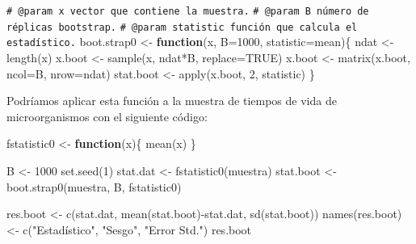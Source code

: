 \documentclass[
  10pt,
]{book}
\newenvironment{Shaded}{\begin{snugshade}}{\end{snugshade}}
\newcommand{\AttributeTok}[1]{\textcolor[rgb]{0.77,0.63,0.00}{#1}}
\newcommand{\CommentTok}[1]{\textcolor[rgb]{0.56,0.35,0.01}{\textit{#1}}}
\newcommand{\ConstantTok}[1]{\textcolor[rgb]{0.00,0.00,0.00}{#1}}
\newcommand{\ControlFlowTok}[1]{\textcolor[rgb]{0.13,0.29,0.53}{\textbf{#1}}}
\newcommand{\DecValTok}[1]{\textcolor[rgb]{0.00,0.00,0.81}{#1}}
\newcommand{\FunctionTok}[1]{\textcolor[rgb]{0.00,0.00,0.00}{#1}}
\newcommand{\NormalTok}[1]{#1}
\newcommand{\OtherTok}[1]{\textcolor[rgb]{0.56,0.35,0.01}{#1}}
\newcommand{\SpecialCharTok}[1]{\textcolor[rgb]{0.00,0.00,0.00}{#1}}
\newcommand{\StringTok}[1]{\textcolor[rgb]{0.31,0.60,0.02}{#1}}
\theoremstyle{break}
\theoremstyle{nonumberplain}
\renewcommand{\CommentTok}[1]{\textcolor[rgb]{0.41,0.41,0.41}{\texttt{#1}}}
\begin{document}
\begin{Shaded}
\begin{Highlighting}[]
\CommentTok{\#\textquotesingle{} @param x vector que contiene la muestra.}
\CommentTok{\#\textquotesingle{} @param B número de réplicas bootstrap.}
\CommentTok{\#\textquotesingle{} @param statistic función que calcula el estadístico.}
\NormalTok{boot.strap0 }\OtherTok{\textless{}{-}} \ControlFlowTok{function}\NormalTok{(x, }\AttributeTok{B=}\DecValTok{1000}\NormalTok{, }\AttributeTok{statistic=}\NormalTok{mean)\{}
\NormalTok{  ndat }\OtherTok{\textless{}{-}} \FunctionTok{length}\NormalTok{(x)}
\NormalTok{  x.boot }\OtherTok{\textless{}{-}} \FunctionTok{sample}\NormalTok{(x, ndat}\SpecialCharTok{*}\NormalTok{B, }\AttributeTok{replace=}\ConstantTok{TRUE}\NormalTok{)}
\NormalTok{  x.boot }\OtherTok{\textless{}{-}} \FunctionTok{matrix}\NormalTok{(x.boot, }\AttributeTok{ncol=}\NormalTok{B, }\AttributeTok{nrow=}\NormalTok{ndat)}
\NormalTok{  stat.boot }\OtherTok{\textless{}{-}} \FunctionTok{apply}\NormalTok{(x.boot, }\DecValTok{2}\NormalTok{, statistic)}
\NormalTok{\}}
\end{Highlighting}
\end{Shaded}

Podríamos aplicar esta función a la muestra de tiempos de vida de
microorganismos con el siguiente código:

\begin{Shaded}
\begin{Highlighting}[]
\NormalTok{fstatistic0 }\OtherTok{\textless{}{-}} \ControlFlowTok{function}\NormalTok{(x)\{}
  \FunctionTok{mean}\NormalTok{(x)}
\NormalTok{\}}

\NormalTok{B }\OtherTok{\textless{}{-}} \DecValTok{1000}
\FunctionTok{set.seed}\NormalTok{(}\DecValTok{1}\NormalTok{)}
\NormalTok{stat.dat }\OtherTok{\textless{}{-}} \FunctionTok{fstatistic0}\NormalTok{(muestra)}
\NormalTok{stat.boot }\OtherTok{\textless{}{-}} \FunctionTok{boot.strap0}\NormalTok{(muestra, B, fstatistic0)}

\NormalTok{res.boot }\OtherTok{\textless{}{-}} \FunctionTok{c}\NormalTok{(stat.dat, }\FunctionTok{mean}\NormalTok{(stat.boot)}\SpecialCharTok{{-}}\NormalTok{stat.dat, }\FunctionTok{sd}\NormalTok{(stat.boot))}
\FunctionTok{names}\NormalTok{(res.boot) }\OtherTok{\textless{}{-}} \FunctionTok{c}\NormalTok{(}\StringTok{"Estadístico"}\NormalTok{, }\StringTok{"Sesgo"}\NormalTok{, }\StringTok{"Error Std."}\NormalTok{)}
\NormalTok{res.boot}
\end{Highlighting}
\end{Shaded}
\end{document}
